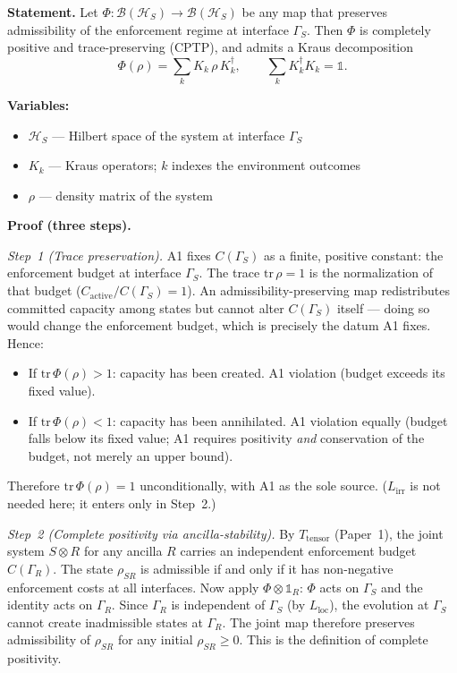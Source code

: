 \documentclass[11pt]{article}
\newenvironment{varlist}{\begin{itemize}[nosep,leftmargin=2em]}{\end{itemize}}
\newcommand{\epitag}[1]{\textbf{[#1]}}
\begin{document}
\begin{tcolorbox}[apfbox, title={Theorem $T_{\mathrm{CPTP}}$ (Complete Positivity) \epitag{P}}]
\textbf{Statement.}
Let $\Phi: \mathcal{B}(\mathcal{H}_S) \to \mathcal{B}(\mathcal{H}_S)$ be any
map that preserves admissibility of the enforcement regime at interface
$\Gamma_S$.  Then $\Phi$ is completely positive and trace-preserving (CPTP),
and admits a Kraus decomposition
\[
  \Phi(\rho) = \sum_k K_k\,\rho\,K_k^\dagger, \qquad
  \sum_k K_k^\dagger K_k = \mathbb{1}.
\]

\textbf{Variables:}
\begin{varlist}
  \item $\mathcal{H}_S$ --- Hilbert space of the system at interface $\Gamma_S$
  \item $K_k$ --- Kraus operators; $k$ indexes the environment outcomes
  \item $\rho$ --- density matrix of the system
\end{varlist}

\textbf{Proof (three steps).}

\smallskip\noindent\textit{Step~1 (Trace preservation).}
A1 fixes $C(\Gamma_S)$ as a finite, positive constant: the enforcement budget
at interface $\Gamma_S$.  The trace $\mathrm{tr}\,\rho = 1$ is the
normalization of that budget ($C_{\mathrm{active}}/C(\Gamma_S) = 1$).  An
admissibility-preserving map redistributes committed capacity among states but
cannot alter $C(\Gamma_S)$ itself --- doing so would change the enforcement
budget, which is precisely the datum A1 fixes.  Hence:
\begin{itemize}[nosep]
  \item If $\mathrm{tr}\,\Phi(\rho) > 1$: capacity has been created.  A1
    violation (budget exceeds its fixed value).
  \item If $\mathrm{tr}\,\Phi(\rho) < 1$: capacity has been annihilated.
    A1 violation equally (budget falls below its fixed value; A1 requires
    positivity \emph{and} conservation of the budget, not merely an upper
    bound).
\end{itemize}
Therefore $\mathrm{tr}\,\Phi(\rho) = 1$ unconditionally, with A1 as the sole
source.  ($L_{\mathrm{irr}}$ is not needed here; it enters only in Step~2.)

\smallskip\noindent\textit{Step~2 (Complete positivity via ancilla-stability).}
By $T_{\mathrm{tensor}}$ (Paper~1), the joint system $S\otimes R$ for any
ancilla $R$ carries an independent enforcement budget $C(\Gamma_R)$.  The
state $\rho_{SR}$ is admissible if and only if it has non-negative
enforcement costs at all interfaces.  Now apply $\Phi\otimes\mathbb{1}_R$:
$\Phi$ acts on $\Gamma_S$ and the identity acts on $\Gamma_R$.  Since
$\Gamma_R$ is independent of $\Gamma_S$ (by $L_{\mathrm{loc}}$), the
evolution at $\Gamma_S$ cannot create inadmissible states at $\Gamma_R$.
The joint map therefore preserves admissibility of $\rho_{SR}$ for any
initial $\rho_{SR} \geq 0$.  This is the definition of complete positivity.


\end{tcolorbox}
\end{document}
